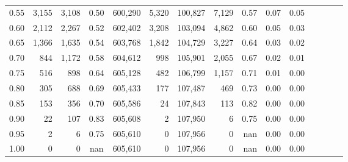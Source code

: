 \begin{tabular}{rrrcrrrrrrrrrrr}
0.55 &    3,155 &   3,108 &                                       0.50 &  600,290 &    5,320 &  100,827 &    7,129 &  0.57 &  0.07 &                         0.05 \\
0.60 &    2,112 &   2,267 &                                       0.52 &  602,402 &    3,208 &  103,094 &    4,862 &  0.60 &  0.05 &                         0.03 \\
0.65 &    1,366 &   1,635 &                                       0.54 &  603,768 &    1,842 &  104,729 &    3,227 &  0.64 &  0.03 &                         0.02 \\
0.70 &      844 &   1,172 &                                       0.58 &  604,612 &      998 &  105,901 &    2,055 &  0.67 &  0.02 &                         0.01 \\
0.75 &      516 &     898 &                                       0.64 &  605,128 &      482 &  106,799 &    1,157 &  0.71 &  0.01 &                         0.00 \\
0.80 &      305 &     688 &                                       0.69 &  605,433 &      177 &  107,487 &      469 &  0.73 &  0.00 &                         0.00 \\
0.85 &      153 &     356 &                                       0.70 &  605,586 &       24 &  107,843 &      113 &  0.82 &  0.00 &                         0.00 \\
0.90 &       22 &     107 &                                       0.83 &  605,608 &        2 &  107,950 &        6 &  0.75 &  0.00 &                         0.00 \\
0.95 &        2 &       6 &                                       0.75 &  605,610 &        0 &  107,956 &        0 &   nan &  0.00 &                         0.00 \\
1.00 &        0 &       0 &                                        nan &  605,610 &        0 &  107,956 &        0 &   nan &  0.00 &                         0.00 \\
\bottomrule
\end{tabular}
